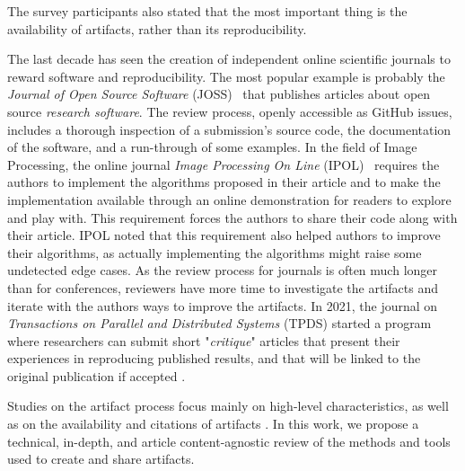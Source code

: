 \documentclass[sigconf,natbib=false]{acmart}
\newcommand{\ad}{AD}
\newcommand{\aeval}{AE}
\newcommand{\adae}{\ad/\aeval}
\newcommand{\todo}[1]{{\color{red}{TODO: #1}}}
\begin{document}
The survey participants \cite{hermann2020community} also stated that the most important thing is the availability of artifacts, rather than its reproducibility.

The last decade has seen the creation of independent online scientific journals to reward software and reproducibility.
The most popular example is probably the \emph{Journal of Open Source Software} (JOSS)\ \cite{smith2018journal} that publishes articles about open source \emph{research software}.
The review process, openly accessible as GitHub issues, includes a thorough inspection of a submission's source code, the documentation of the software, and a run-through of some examples.
In the field of Image Processing, the online journal \emph{Image Processing On Line} (IPOL)\ \cite{colom2015ipol} requires the authors to implement the algorithms proposed in their article and to make the implementation available through an online demonstration for readers to explore and play with.
This requirement forces the authors to share their code along with their article.
IPOL noted that this requirement also helped authors to improve their algorithms, as actually implementing the algorithms might raise some undetected edge cases.
As the review process for journals is often much longer than for conferences, reviewers have more time to investigate the artifacts and iterate with the authors ways to improve the artifacts.
In 2021, the journal on \emph{Transactions on Parallel and Distributed Systems} (TPDS) started a program where researchers can submit short "\emph{critique}" articles that present their experiences in reproducing published results, and that will be linked to the original publication if accepted \cite{tpds}.



Studies on the artifact process focus mainly on high-level characteristics, as well as on the availability and citations of artifacts \cite{kidwell2016badges, rowhani2017incentives, winter2022retrospective, frachtenberg2022research, heumuller2020publish}. 
In this work, we propose a technical, in-depth, and article content-agnostic review of the methods and tools used to create and share artifacts.


%
%
\end{document}
